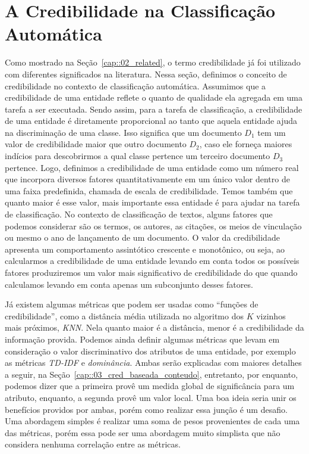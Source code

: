 \chapter{A Credibilidade na Classificação Automática} 
\label{cap::03_metodo}

Como mostrado na Seção~\ref{cap::02_related}, o termo credibilidade já foi utilizado com diferentes significados na literatura. Nessa seção, definimos o conceito de credibilidade no contexto de classificação automática. Assumimos que a credibilidade de uma entidade reflete o quanto de qualidade ela agregada em uma tarefa a ser executada. Sendo assim, para a tarefa de classificação, a credibilidade de uma entidade é diretamente proporcional ao tanto que aquela entidade ajuda na discriminação de uma classe. Isso significa que um documento $D_{1}$ tem um valor de credibilidade maior que outro documento $D_{2}$, caso ele forneça maiores indícios para descobrirmos a qual classe pertence um terceiro documento $D_{3}$ pertence. Logo, definimos a credibilidade de uma entidade como um número real que incorpora diversos fatores quantitativamente em um único valor dentro de uma faixa predefinida, chamada de escala de credibilidade. Temos também que quanto maior é esse valor, mais importante essa entidade é para ajudar na tarefa de classificação. No contexto de classificação de textos, alguns fatores que podemos considerar são os termos, os autores, as citações, os meios de vinculação ou mesmo o ano de lançamento de um documento. O valor da credibilidade apresenta um comportamento assintótico crescente e monotônico, ou seja, ao calcularmos a credibilidade de uma entidade levando em conta todos os possíveis fatores produziremos um valor mais significativo de credibilidade do que quando calculamos levando em conta apenas um subconjunto desses fatores.

Já existem algumas métricas que podem ser usadas como ``funções de credibilidade'', como a distância média utilizada no algoritmo dos $K$ vizinhos mais próximos, \textit{KNN}. Nela quanto maior é a distância, menor é a credibilidade da informação provida. Podemos ainda definir algumas métricas que levam em consideração o valor discriminativo dos atributos de uma entidade, por exemplo as métricas \textit{TD-IDF} e \textit{dominância}. Ambas serão explicadas com maiores detalhes a seguir, na Seção~\ref{cap::03_cred_baseada_conteudo}, entretanto, por enquanto, podemos dizer que a primeira provê um medida global de significância para um atributo, enquanto, a segunda provê um valor local. Uma boa ideia seria unir os benefícios providos por ambas, porém como realizar essa junção é um desafio. Uma abordagem simples é realizar uma soma de pesos provenientes de cada uma das métricas, porém essa pode ser uma abordagem muito simplista que não considera nenhuma correlação entre as métricas.

